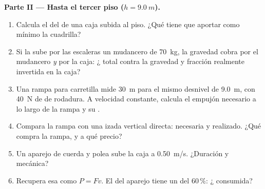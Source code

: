 \begin{problem}
\medskip
\noindent\textbf{Parte II --- Hasta el tercer piso ($h = \qty{9.0}{m}$).}
\begin{enumerate}[resume]
  \item Calcula el  del  de una caja subida al piso. ¿Qué
         tiene que aportar como mínimo la cuadrilla?
  \item Si la sube por las escaleras un mudancero de \qty{70}{kg}, la
        gravedad cobra por el mudancero \emph{y} por la caja: ¿
        total contra la gravedad y fracción realmente invertida en la
        caja?
  \item Una rampa para carretilla mide \qty{30}{m} para el mismo
        desnivel de \qty{9.0}{m}, con \qty{40}{N} de  de
        rodadura. A velocidad constante, calcula el empujón necesario a
        lo largo de la rampa y su .
  \item Compara la rampa con una izada vertical directa: 
        necesaria y  realizado. ¿Qué compra la rampa, y a qué
        precio?
  \item Un aparejo de cuerda y polea sube la caja a \qty{0.50}{m/s}.
        ¿Duración y  mecánica?
  \item Recupera esa  como $P = Fv$. El  del aparejo tiene
        un  del $60\,\%$: ¿ consumida?
\end{enumerate}


\end{problem}
